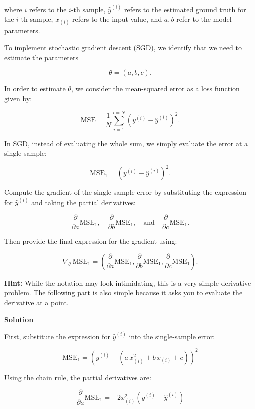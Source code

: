 \documentclass[12pt]{article}
\begin{document}
	where \(i\) refers to the \(i\)-th sample, \(\hat{y}^{(i)}\) refers to the estimated ground truth for the \(i\)-th sample, \(x_{(i)}\) refers to the input value, and \(a,b\) refer to the model parameters.
	
	To implement stochastic gradient descent (SGD), we identify that we need to estimate the parameters
	
	\[
	\theta = (a,b,c).
	\]
	
	In order to estimate \(\theta\), we consider the mean-squared error as a loss function given by:
	
	\[
	\mathrm{MSE}
	=
	\frac{1}{N}
	\sum_{i=1}^{i=N}
	\left(
	y^{(i)}-\hat{y}^{(i)}
	\right)^2 .
	\]
	
	In SGD, instead of evaluating the whole sum, we simply evaluate the error at a single sample:
	
	\[
	\mathrm{MSE}_1
	=
	\left(
	y^{(i)}-\hat{y}^{(i)}
	\right)^2 .
	\]
	
	Compute the gradient of the single-sample error by substituting the expression for \(\hat{y}^{(i)}\) and taking the partial derivatives:
	
	\[
	\frac{\partial}{\partial a}\mathrm{MSE}_1,
	\quad
	\frac{\partial}{\partial b}\mathrm{MSE}_1,
	\quad
	\text{and}
	\quad
	\frac{\partial}{\partial c}\mathrm{MSE}_1 .
	\]
	
	Then provide the final expression for the gradient using:
	
	\[
	\nabla_{\theta}\ \mathrm{MSE}_1
	=
	\left(
	\frac{\partial}{\partial a}\mathrm{MSE}_1,
	\frac{\partial}{\partial b}\mathrm{MSE}_1,
	\frac{\partial}{\partial c}\mathrm{MSE}_1
	\right).
	\]
	
	\textbf{Hint:} While the notation may look intimidating, this is a very simple derivative problem. The following part is also simple because it asks you to evaluate the derivative at a point.

	\vspace{0.2cm}
	
	\noindent\textbf{Solution}
	
	First, substitute the expression for \(\hat{y}^{(i)}\) into the single-sample error:
	
	\[
	\mathrm{MSE}_1
	=
	\left(
	y^{(i)}
	-
	\left(
	a\,x_{(i)}^2+b\,x_{(i)}+c
	\right)
	\right)^2
	\]
	
	Using the chain rule, the partial derivatives are:
	
	\[
	\frac{\partial}{\partial a}\mathrm{MSE}_1
	=
	-2x_{(i)}^2
	\left(
	y^{(i)}-\hat{y}^{(i)}
	\right)
	\]
	
\end{document}
